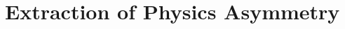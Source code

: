 \section{Extraction of Physics Asymmetry}
\label{Extraction of Physics Asymmetry}
%
%
%
%
%	
%
%
%
%
